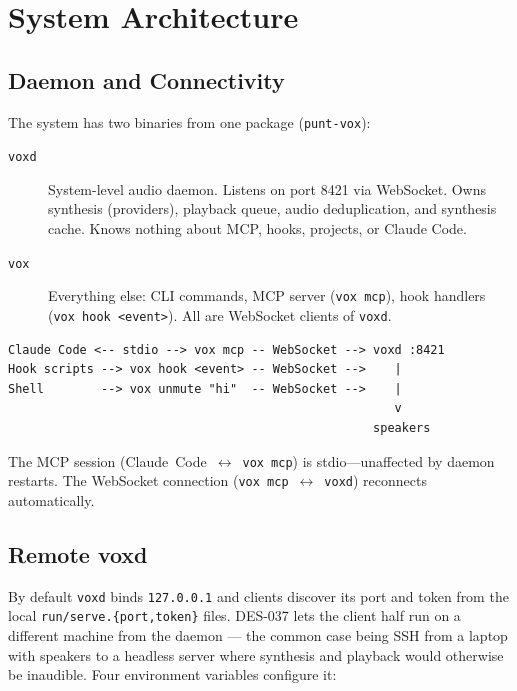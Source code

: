 \documentclass[a4paper,10pt]{article}
\begin{document}
\section{System Architecture}

\subsection{Daemon and Connectivity}

The system has two binaries from one package (\texttt{punt-vox}):

\begin{description}
  \item[\texttt{voxd}] System-level audio daemon.  Listens on port
    8421 via WebSocket.  Owns synthesis (providers), playback queue,
    audio deduplication, and synthesis cache.  Knows nothing about
    MCP, hooks, projects, or Claude Code.
  \item[\texttt{vox}] Everything else: CLI commands, MCP server
    (\texttt{vox mcp}), hook handlers (\texttt{vox hook <event>}).
    All are WebSocket clients of \texttt{voxd}.
\end{description}

\begin{verbatim}
Claude Code <-- stdio --> vox mcp -- WebSocket --> voxd :8421
Hook scripts --> vox hook <event> -- WebSocket -->    |
Shell        --> vox unmute "hi"  -- WebSocket -->    |
                                                      v
                                                   speakers
\end{verbatim}

The MCP session (Claude~Code~$\leftrightarrow$~\texttt{vox mcp}) is
stdio---unaffected by daemon restarts.  The WebSocket connection
(\texttt{vox mcp}~$\leftrightarrow$~\texttt{voxd}) reconnects
automatically.

\subsection{Remote voxd}

By default \texttt{voxd} binds \texttt{127.0.0.1} and clients discover
its port and token from the local \texttt{run/serve.\{port,token\}}
files.  DES-037 lets the client half run on a different machine from the
daemon --- the common case being SSH from a laptop with speakers to a
headless server where synthesis and playback would otherwise be
inaudible.  Four environment variables configure it:
\end{document}
